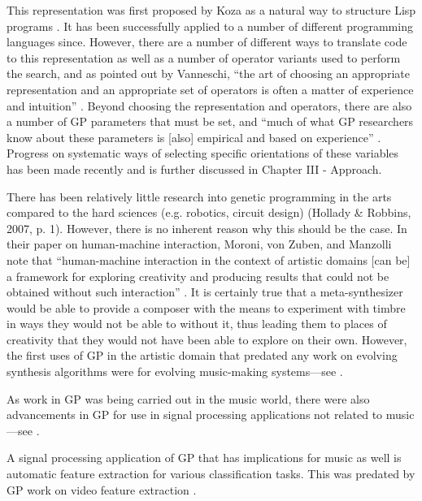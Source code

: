 \documentclass[12pt]{report} 	%
\numberwithin{figure}{chapter}
\numberwithin{table}{chapter}
\numberwithin{equation}{chapter}
\begin{document}
\begin{flushleft}
This representation was first proposed by Koza as a natural way to structure Lisp programs \cite{Koza:1992gp}. It has been successfully applied to a number of different programming languages since. However, there are a number of different ways to translate code to this representation as well as a number of operator variants  used to perform the search, and as pointed out by Vanneschi, ``the art of choosing an appropriate representation and an appropriate set of operators is often a matter of experience and intuition'' \cite[p. 6]{Vanneschi:2004le}. Beyond choosing the representation and operators, there are also a number of GP parameters that must be set, and ``much of what GP researchers know about these parameters is [also] empirical and based on experience'' \cite[p. 32]{Vanneschi:2004le}. Progress on systematic ways of selecting specific orientations of these variables has been made recently and is further discussed in Chapter III - Approach.

There has been relatively little research into genetic programming in the arts compared to the hard sciences (e.g. robotics, circuit design) (Hollady \& Robbins, 2007, p. 1). However, there is no inherent reason why this should be the case. In their paper on human-machine interaction, Moroni, von Zuben, and Manzolli note that ``human-machine interaction in the context of artistic domains [can be] a framework for exploring creativity and producing results that could not be obtained without such interaction'' \cite[p. 185]{Moroni:2002oa}. It is certainly true that a meta-synthesizer would be able to provide a composer with the means to experiment with timbre in ways they would not be able to without it, thus leading them to places of creativity that they would not have been able to explore on their own. However, the first uses of GP in the artistic domain that predated any work on evolving synthesis algorithms were for evolving music-making systems---see \cite{Rowe:NoRead, Spector:1994ij, Johanson:1997gf, Polito:1997ly, Todd:1998tg, Costelloe:2007bv}.

As work in GP was being carried out in the music world, there were also advancements in GP for use in signal processing applications not related to music---see \cite{Sharman:1995bs, Alcazar:1997ve, Koza:1997zr, Miller:1998zr, Uesaka:2000jw, Holladay:2007ct}.

A signal processing application of GP that has implications for music as well is automatic feature extraction for various classification tasks. This was predated by GP work on video feature extraction \cite{Harris:1997qf, Teller:1998ly}. 


\end{flushleft}
\end{document}
